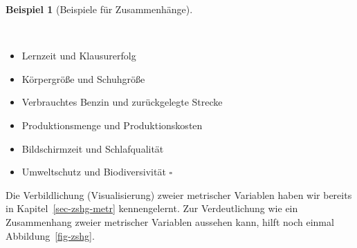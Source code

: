 \documentclass[
  letterpaper,
  twoside,
  open=any]{scrbook}
\providecommand{\tightlist}{%
  \setlength{\itemsep}{0pt}\setlength{\parskip}{0pt}}\usepackage{longtable,booktabs,array}
\theoremstyle{definition}
\theoremstyle{definition}
\theoremstyle{definition}
\newtheorem{example}{Beispiel}[chapter]
\theoremstyle{remark}
\begin{document}
\begin{example}[Beispiele für
Zusammenhänge]\protect\hypertarget{exm-zsmn}{}\label{exm-zsmn}

~

\begin{itemize}
\tightlist
\item
  Lernzeit und Klausurerfolg
\item
  Körpergröße und Schuhgröße
\item
  Verbrauchtes Benzin und zurückgelegte Strecke
\item
  Produktionsmenge und Produktionskosten
\item
  Bildschirmzeit und Schlafqualität
\item
  Umweltschutz und Biodiversivität \(\square\)
\end{itemize}

\end{example}

Die Verbildlichung (Visualisierung) zweier metrischer Variablen haben
wir bereits in Kapitel~\ref{sec-zshg-metr} kennengelernt. Zur
Verdeutlichung wie ein Zusammenhang zweier metrischer Variablen aussehen
kann, hilft noch einmal Abbildung~\ref{fig-zshg}.
\end{document}
